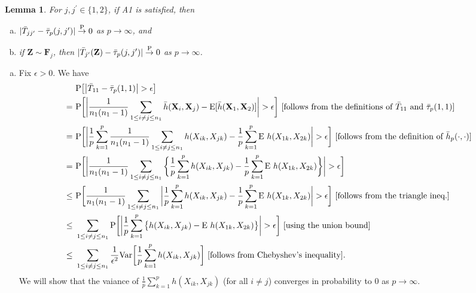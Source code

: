 \documentclass[twoside]{article}
\newcommand{\bX}{\mathbf{X}}
\newcommand{\bZ}{\mathbf{Z}}
\newcommand{\bF}{\mathbf{F}}
\newcommand{\0}{\mathbf{0}}
\newcommand{\1}{\mathbf{1}}
\numberwithin{equation}{section}
\newtheorem{lemma}[thm]{Lemma}
\begin{document}
\begin{lemma}\label{L2}
  For $j,j^\prime\in\{1,2\}$, if {\rm A1} is satisfied, then 
 \begin{enumerate}[(a)]
  \item $|\bar{T}_{jj^\prime}-\bar{\tau}_p(j,j^\prime)|\stackrel{\rm P}{\to}0$ as $p\to\infty $, and 
  \item if $\bZ\sim \bF_j$, then $|\bar{T}_{j^\prime}(\bZ)-\bar{\tau}_p(j,j^\prime)|\stackrel{\rm P}{\to}0$ as $p\to\infty $.
 \end{enumerate}
\end{lemma}
\begin{enumerate}[(a)]
 \item Fix $\epsilon>0$. We have
\begin{align}\label{ref1}
&\ {\rm P}\big [\big |\bar{T}_{11} - \bar{\tau}_p(1,1)\big |>\epsilon\big ]\nonumber\\
= &\ {\rm P} \bigg [\bigg |\frac{1}{n_1(n_1-1)}\sum\limits_{1\leq i\neq j\leq n_1}\bar{h}(\bX_{i},\bX_{j})-{\rm E}[\bar{h}(\bX_{1},\bX_{2})]\bigg |>\epsilon \bigg]\ [\text{follows from the definitions of }\bar{T}_{11}\text{ and }\bar{\tau}_p(1,1)]\nonumber\\
= &\ {\rm P} \bigg [\bigg |\frac{1}{p}\sum_{k=1}^p \frac{1}{n_1(n_1-1)}\sum\limits_{1\leq i\neq j\leq n_1}{h}(X_{ik},X_{jk})-\frac{1}{p}\sum_{k=1}^p {\rm E}\ h(X_{1k},X_{2k})\bigg |>\epsilon \bigg]\ [\text{follows from the definition of }\bar{h}_p(\cdot,\cdot)]\nonumber\\
= &\ {\rm P} \bigg [\bigg |\frac{1}{n_1(n_1-1)}\sum\limits_{1\leq i\neq j\leq n_1}\bigg \{\frac{1}{p}\sum_{k=1}^p {h}(X_{ik},X_{jk}) -\frac{1}{p}\sum_{k=1}^p {\rm E}\ h(X_{1k},X_{2k})\bigg \}\bigg |>\epsilon \bigg]\nonumber \\
\leq &\ {\rm P} \bigg [\frac{1}{n_1(n_1-1)}\sum\limits_{1\leq i\neq j\leq n_1}\bigg |\frac{1}{p}\sum_{k=1}^p {h}(X_{ik},X_{jk}) -\frac{1}{p}\sum_{k=1}^p {\rm E}\ h(X_{1k},X_{2k})\bigg |>\epsilon \bigg]\ [\text{follows from the triangle ineq.}]\nonumber \\
\leq &\ \sum\limits_{1\leq i\neq j\leq n_1}{\rm P} \bigg [\bigg |\frac{1}{p}\sum_{k=1}^p \big \{{h}(X_{ik},X_{jk}) -{\rm E}\ h(X_{1k},X_{2k})\big \}\bigg |>\epsilon \bigg]\ [\text{using the union bound}]\nonumber \\
\leq &\ \sum\limits_{1\leq i\neq j\leq n_1} \frac{1}{\epsilon^2}{\rm Var}\bigg [\frac{1}{p}\sum_{k=1}^p h(X_{ik},X_{jk})\bigg ]\ [\text{follows from Chebyshev's inequality}].
\end{align}
We will show that the vaiance of $\frac{1}{p}\sum_{k=1}^p h(X_{ik},X_{jk})$ (for all $i\neq j$) converges in probability to 0 as $p\to\infty.$


\end{enumerate}
\end{document}
